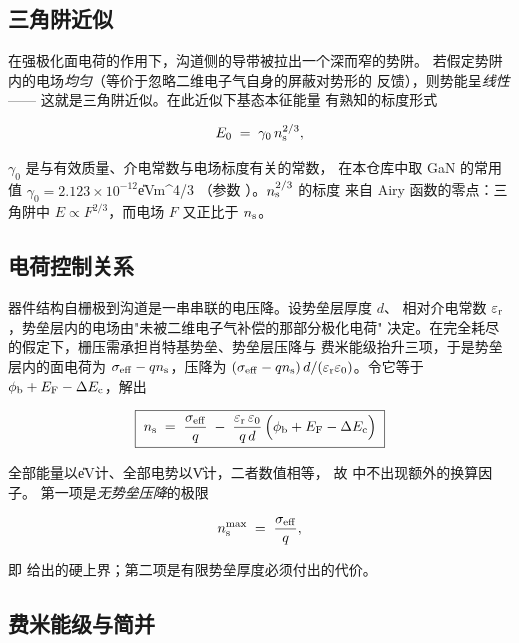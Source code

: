 \subsection{三角阱近似}
\label{sec:tw-triangular}

在强极化面电荷的作用下，沟道侧的导带被拉出一个深而窄的势阱。
若假定势阱内的电场\emph{均匀}（等价于忽略二维电子气自身的屏蔽对势形的
反馈），则势能呈\emph{线性}—— 这就是三角阱近似。在此近似下基态本征能量
有熟知的标度形式

\begin{equation}
E_0 \;=\; \gamma_0\,n_{\mathrm{s}}^{2/3},
\label{eq:e0}
\end{equation}

$\gamma_0$ 是与有效质量、介电常数与电场标度有关的常数，
在本仓库中取 GaN 的常用值 $\gamma_0 = 2.123\times10^{-12}$\U{eV\cdot m^{4/3}}
\cite{ambacher2000}（参数 ）。$n_{\mathrm{s}}^{2/3}$ 的标度
来自 Airy 函数的零点：三角阱中 $E\propto F^{2/3}$，而电场 $F$ 又正比于
$n_{\mathrm{s}}$。

\subsection{电荷控制关系}
\label{sec:tw-charge-control}

器件结构自栅极到沟道是一串串联的电压降。设势垒层厚度 $d$、
相对介电常数 $\varepsilon_{\mathrm{r}}$，势垒层内的电场由"未被二维电子气补偿的那部分极化电荷"
决定。在完全耗尽的假定下，栅压需承担肖特基势垒、势垒层压降与
费米能级抬升三项，于是势垒层内的面电荷为
$\sigma_{\mathrm{eff}} - qn_{\mathrm{s}}$，压降为
$(\sigma_{\mathrm{eff}}-qn_{\mathrm{s}})\,d/(\varepsilon_{\mathrm{r}}\varepsilon_{0})$。令它等于 $\phi_{\mathrm{b}} + E_{\mathrm{F}} - \Delta E_{\mathrm{c}}$，解出

\begin{equation}
\boxed{\;
n_{\mathrm{s}} \;=\; \frac{\sigma_{\mathrm{eff}}}{q}
\;-\; \frac{\varepsilon_{\mathrm{r}}\,\varepsilon_{0}}{q\,d}\,
\Bigl(\phi_{\mathrm{b}} + E_{\mathrm{F}} - \Delta E_{\mathrm{c}}\Bigr)
\;}
\label{eq:charge-control}
\end{equation}

全部能量以\U{eV}计、全部电势以\U{V}计，二者数值相等，
故  中不出现额外的换算因子。
第一项是\emph{无势垒压降}的极限

\begin{equation}
n_{\mathrm{s}}^{\max} \;=\; \frac{\sigma_{\mathrm{eff}}}{q},
\label{eq:tw-upper}
\end{equation}

即  给出的硬上界；第二项是有限势垒厚度必须付出的代价。

\subsection{费米能级与简并}
\label{sec:tw-fermi}

